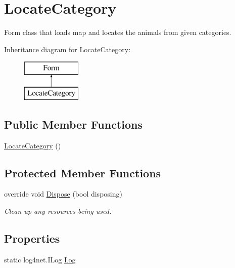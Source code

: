 \hypertarget{classWildlifeTrackingApp_1_1LocateCategory}{}\section{Locate\+Category}
\label{classWildlifeTrackingApp_1_1LocateCategory}


Form class that loads map and locates the animals from given categories.  


Inheritance diagram for Locate\+Category\+:\begin{figure}[H]
\begin{center}
\leavevmode
\includegraphics[height=2.000000cm]{classWildlifeTrackingApp_1_1LocateCategory}
\end{center}
\end{figure}
\subsection*{Public Member Functions}
\begin{DoxyCompactItemize}
\item 
\hyperlink{classWildlifeTrackingApp_1_1LocateCategory_abdc0fce16d0e2de3af4c81225ae3c925}{Locate\+Category} ()
\end{DoxyCompactItemize}
\subsection*{Protected Member Functions}
\begin{DoxyCompactItemize}
\item 
override void \hyperlink{classWildlifeTrackingApp_1_1LocateCategory_a849c3c7f8d08104f0cdb46bee9fe6389}{Dispose} (bool disposing)
\begin{DoxyCompactList}\small\item\em Clean up any resources being used. \end{DoxyCompactList}\end{DoxyCompactItemize}
\subsection*{Properties}
\begin{DoxyCompactItemize}
\item 
static log4net.\+I\+Log \hyperlink{classWildlifeTrackingApp_1_1LocateCategory_a5fc9abb86e6110ecd61d0a1a7d740a8a}{Log}
\end{DoxyCompactItemize}
